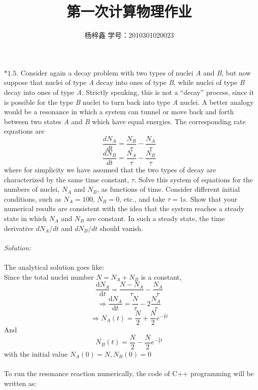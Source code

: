 \documentclass[a4paper]{article}
\author{杨梓鑫 学号：2010301020023}
\title{第一次计算物理作业}
\begin{document}
	\maketitle
	\noindent $*\mathbf{1.5.}$	
	Consider again a decay problem with two types of nuclei \emph{A} and \emph{B}, but now suppose that nuclei of type \emph{A} decay into ones of type \emph{B}, while nuclei of type \emph{B} decay into ones of type \emph{A}. Strictly speaking, this is not a ``decay'' process, since it is possible for the type \emph{B} nuclei to turn back into type \emph{A} nuclei. A better analogy would be a resonance in which a system can tunnel or move back and forth between two states \emph{A} and \emph{B} which have equal energies. The corresponding rate equations are
	\begin{equation}
		\frac{dN_A}{dt}=\frac{N_B}{\tau}-\frac{N_A}{\tau}
	\end{equation}
	\begin{equation}
		\frac{dN_B}{dt}=\frac{N_A}{\tau}-\frac{N_B}{\tau}
	\end{equation}
where for simplicity we have assumed that the two types of decay are characterized by the same time constant, $\tau$. Solve this system of equations for the numbers of nuclei, $N_A$ and $N_B$, as functions of time. Consider different initial conditions, such as $N_A=100$, $N_B=0$, etc., and take $\tau=1$s. Show that your numerical results are consistent with the idea that the system reaches a steady state in which $N_A$ and $N_B$ are constant. In such a steady state, the time derivative $dN_A/dt$ and $dN_B/dt$ should vanish.\\\\
\emph{Solution:}\\\\
The analytical solution goes like:\\
Since the total nuclei number $N=N_A+N_B$ is a constant,
$$\frac{\textrm{d}N_A}{\textrm{d}t}=\frac{N-N_A}{\tau}-\frac{N_A}{\tau}$$
$$\Rightarrow\frac{\textrm{d}N_A}{\textrm{d}t}=\frac{N}{\tau}-2\frac{N_A}{\tau}$$
$$\Rightarrow N_A\left(t\right)=\frac{N}{2}+\frac{N}{2}e^{-\frac{2}{\tau}t}$$
And$$N_B\left(t\right)=\frac{N}{2}-\frac{N}{2}e^{-\frac{2}{\tau}t}$$
with the initial value $N_A(0)=N,N_B(0)=0$\\\\
To run the resonance reaction numerically, the code of C++ programming will be written as:
\end{document}
